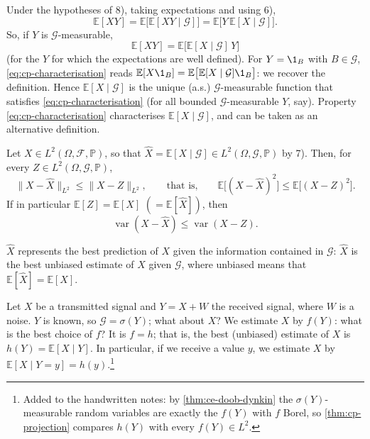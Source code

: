 \begin{remark}\label{rem:cp-characterisation}
Under the hypotheses of 8), taking expectations and using 6),
\[
  \mathbb E[XY]=\mathbb E\big[\mathbb E[XY\mid\mathcal G]\big]=\mathbb E\big[Y\,\mathbb E[X\mid\mathcal G]\big].
\]
So, if $Y$ is $\mathcal G$-measurable,
\begin{equation}\label{eq:cp-characterisation}
  \mathbb E[XY]=\mathbb E\big[\mathbb E[X\mid\mathcal G]\,Y\big]
\end{equation}
(for the $Y$ for which the expectations are well defined). For $Y=\1_B$ with $B\in\mathcal G$,
\eqref{eq:cp-characterisation} reads $\mathbb E[X\1_B]=\mathbb E\big[\mathbb E[X\mid\mathcal G]\1_B\big]$:
we recover the definition. Hence $\mathbb E[X\mid\mathcal G]$ is the unique (a.s.)
$\mathcal G$-measurable function that satisfies \eqref{eq:cp-characterisation} (for all bounded
$\mathcal G$-measurable $Y$, say). Property \eqref{eq:cp-characterisation} characterises
$\mathbb E[X\mid\mathcal G]$, and can be taken as an alternative definition.
\end{remark}

\begin{theorem}\label{thm:cp-projection}
Let $X\in L^2(\Omega,\mathcal F,\mathbb P)$, so that $\hat X=\mathbb E[X\mid\mathcal G]\in L^2(\Omega,\mathcal G,\mathbb P)$
by 7). Then, for every $Z\in L^2(\Omega,\mathcal G,\mathbb P)$,
\[
  \|X-\hat X\|_{L^2}\le\|X-Z\|_{L^2},\qquad\text{that is,}\qquad
  \mathbb E\big[(X-\hat X)^2\big]\le\mathbb E\big[(X-Z)^2\big].
\]
If in particular $\mathbb E[Z]=\mathbb E[X]$ $(=\mathbb E[\hat X])$, then
\[
  \operatorname{var}(X-\hat X)\le\operatorname{var}(X-Z).
\]
\end{theorem}

$\hat X$ represents the best prediction of $X$ given the information contained in $\mathcal G$:
$\hat X$ is the best unbiased estimate of $X$ given $\mathcal G$, where unbiased means that
$\mathbb E[\hat X]=\mathbb E[X]$.

\begin{example}\label{exa:cp-signal}
Let $X$ be a transmitted signal and $Y=X+W$ the received signal, where $W$ is a noise. $Y$ is
known, so $\mathcal G=\sigma(Y)$; what about $X$? We estimate $X$ by $f(Y)$: what is the best
choice of $f$? It is $f=h$; that is, the best (unbiased) estimate of $X$ is
$h(Y)=\mathbb E[X\mid Y]$. In particular, if we receive a value $y$, we estimate $X$ by
$\mathbb E[X\mid Y=y]=h(y)$.\footnote{Added to the handwritten notes: by \cref{thm:ce-doob-dynkin}
the $\sigma(Y)$-measurable random variables are exactly the $f(Y)$ with $f$ Borel, so
\cref{thm:cp-projection} compares $h(Y)$ with every $f(Y)\in L^2$.}
\end{example}

